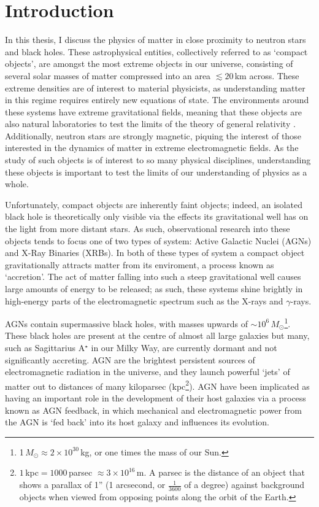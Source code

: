\chapter{Introduction}

\par In this thesis, I discuss the physics of matter in close proximity to neutron stars and black holes.  These astrophysical entities, collectively referred to as `compact objects',  are amongst the most extreme objects in our universe, consisting of several solar masses of matter compressed into an area $\lesssim20$\,km across.  These extreme densities are of interest to material physicists, as understanding matter in this regime requires entirely new equations of state.  The environments around these systems have extreme gravitational fields, meaning that these objects are also natural laboratories to test the limits of the theory of general relativity \citep{Einstein_GR}.  Additionally, neutron stars are strongly magnetic, piquing the interest of those interested in the dynamics of matter in extreme electromagnetic fields.  As the study of such objects is of interest to so many physical disciplines, understanding these objects is important to test the limits of our understanding of physics as a whole.
\par Unfortunately, compact objects are inherently faint objects; indeed, an isolated black hole is theoretically only visible via the effects its gravitational well has on the light from more distant stars.  As such, observational research into these objects tends to focus one of two types of system: Active Galactic Nuclei (AGNs) and X-Ray Binaries (XRBs).  In both of these types of system a compact object gravitationally attracts matter from its enviroment, a process known as `accretion'.  The act of matter falling into such a steep gravitational well causes large amounts of energy to be released; as such, these systems shine brightly in high-energy parts of the electromagnetic spectrum such as the X-rays and $\gamma$-rays.
\par AGNs contain supermassive black holes, with masses upwards of $\sim10^6$\,$M_\odot$\footnote{1\,$M_\odot\approx2\times10^{30}$\,kg, or one times the mass of our Sun.}.  These black holes are present at the centre of almost all large galaxies but many, such as Sagittarius A$^\star$ in our Milky Way, are currently dormant and not significantly accreting.  AGN are the brightest persistent sources of electromagnetic radiation in the universe, and they launch powerful `jets' of matter out to distances of many kiloparsec (kpc\footnote{$1$\,kpc$ =1000$\,parsec $\approx3\times10^{16}$\,m.  A parsec is the distance of an object that shows a parallax of 1'' (1 arcsecond, or $\frac{1}{3600}$ of a degree) against background objects when viewed from opposing points along the orbit of the Earth.}).  AGN have been implicated as having an important role in the development of their host galaxies via a process known as AGN feedback, in which mechanical and electromagnetic power from the AGN is `fed back' into its host galaxy and influences its evolution.
